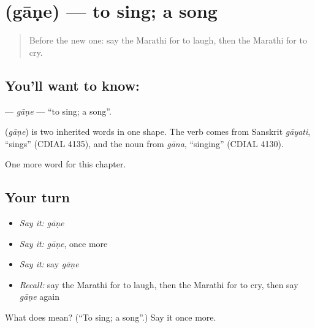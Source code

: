\section[\texorpdfstring{\mr{गाणे} (gāṇe)}{गाणे (gāṇe)}]{ (gāṇe) — to sing; a song}

\label{lesson:MR-C79-gane}



\begin{quote}
Before the new one: say the Marathi for to laugh, then the Marathi for to cry.
\end{quote}

\subsection*{You'll want to know: }
\textbf{} — \emph{gāṇe} — \textquotedblleft{}to sing; a song\textquotedblright{}.

\begin{cousinweb}
\textbf{} (\emph{gāṇe}) is two inherited words in one shape. The verb comes from Sanskrit \emph{gāyati}, \textquotedblleft{}sings\textquotedblright{} (CDIAL 4135), and the noun from \emph{gāna}, \textquotedblleft{}singing\textquotedblright{} (CDIAL 4130).
\end{cousinweb}

\begin{grammarlens}[title={What you've built}]
One more word for this chapter.
\end{grammarlens}

\subsection*{Your turn}
\begin{itemize}
\raggedright
  \item \emph{Say it:} \emph{gāṇe}
  \item \emph{Say it:} \emph{gāṇe}, once more
  \item \emph{Say it:} say \emph{gāṇe}
  \item \emph{Recall:} say the Marathi for to laugh, then the Marathi for to cry, then say \emph{gāṇe} again
\end{itemize}

\begin{tcolorbox}[breakable,colback=teal!4,colframe=teal!35!black,title={Before you move on}]
What does  mean? (\textquotedblleft{}To sing; a song\textquotedblright{}.) Say it once more.
\end{tcolorbox}

